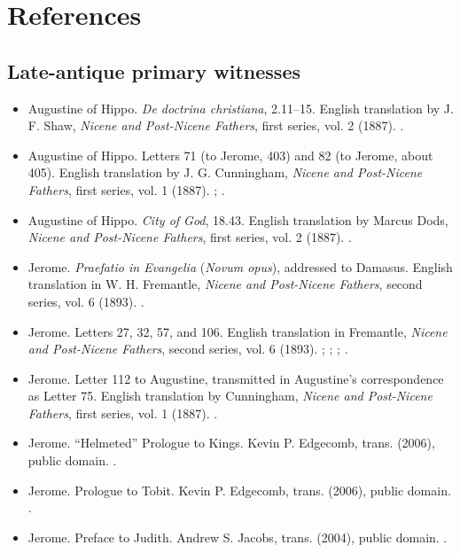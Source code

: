 \section{References}

\subsection{Late-antique primary witnesses}

\begin{itemize}
\item Augustine of Hippo. \emph{De doctrina christiana}, 2.11--15. English translation by J. F. Shaw, \emph{Nicene and Post-Nicene Fathers}, first series, vol. 2 (1887). .
\item Augustine of Hippo. Letters 71 (to Jerome, 403) and 82 (to Jerome, about 405). English translation by J. G. Cunningham, \emph{Nicene and Post-Nicene Fathers}, first series, vol. 1 (1887). ; .
\item Augustine of Hippo. \emph{City of God}, 18.43. English translation by Marcus Dods, \emph{Nicene and Post-Nicene Fathers}, first series, vol. 2 (1887). .
\item Jerome. \emph{Praefatio in Evangelia} (\emph{Novum opus}), addressed to Damasus. English translation in W. H. Fremantle, \emph{Nicene and Post-Nicene Fathers}, second series, vol. 6 (1893). .
\item Jerome. Letters 27, 32, 57, and 106. English translation in Fremantle, \emph{Nicene and Post-Nicene Fathers}, second series, vol. 6 (1893). ; ; ; .
\item Jerome. Letter 112 to Augustine, transmitted in Augustine's correspondence as Letter 75. English translation by Cunningham, \emph{Nicene and Post-Nicene Fathers}, first series, vol. 1 (1887). .
\item Jerome. ``Helmeted'' Prologue to Kings. Kevin P. Edgecomb, trans. (2006), public domain. .
\item Jerome. Prologue to Tobit. Kevin P. Edgecomb, trans. (2006), public domain. .
\item Jerome. Preface to Judith. Andrew S. Jacobs, trans. (2004), public domain. .
\end{itemize}

